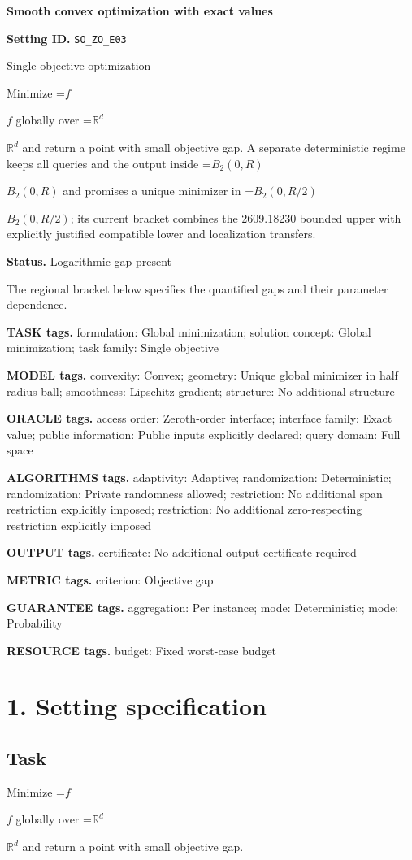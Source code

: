 \documentclass[10pt,a4paper]{article}
\newcommand{\AtlasMath}[1]{\par\begingroup\centering\setbox0=\hbox{$\displaystyle #1$}\ifdim\wd0>1.4\linewidth\typeout{ATLAS WIDE FORMULA: \the\wd0}\fi\ifdim\wd0>\linewidth\resizebox{\linewidth}{!}{\box0}\else\box0\fi\par\endgroup}
\newcommand{\AtlasInlineMath}[1]{\begingroup\setbox0=\hbox{$#1$}\ifdim\wd0>.4\linewidth\endgroup\AtlasMath{#1}\else\endgroup$#1$\fi}
\begin{document}
\raggedright

{\LARGE\bfseries\sffamily\color{AtlasNavy} Smooth convex optimization with exact values\par}\vspace{5pt}
\textbf{Setting ID.} \texttt{SO\_\allowbreak{}ZO\_\allowbreak{}E03}

Single-objective optimization

Minimize \AtlasInlineMath{f} globally over \AtlasInlineMath{\mathbb{R}^d} and return a point with small objective gap. A separate deterministic regime keeps all queries and the output inside \AtlasInlineMath{B_2(0,R)} and promises a unique minimizer in \AtlasInlineMath{B_2(0,R/2)}; its current bracket combines the 2609.18230 bounded upper with explicitly justified compatible lower and localization transfers.

\textbf{Status.} Logarithmic gap present

The regional bracket below specifies the quantified gaps and their parameter dependence.

\textbf{TASK tags.} formulation: Global minimization; solution concept: Global minimization; task family: Single objective

\textbf{MODEL tags.} convexity: Convex; geometry: Unique global minimizer in half radius ball; smoothness: Lipschitz gradient; structure: No additional structure

\textbf{ORACLE tags.} access order: Zeroth-order interface; interface family: Exact value; public information: Public inputs explicitly declared; query domain: Full space

\textbf{ALGORITHMS tags.} adaptivity: Adaptive; randomization: Deterministic; randomization: Private randomness allowed; restriction: No additional span restriction explicitly imposed; restriction: No additional zero-respecting restriction explicitly imposed

\textbf{OUTPUT tags.} certificate: No additional output certificate required

\textbf{METRIC tags.} criterion: Objective gap

\textbf{GUARANTEE tags.} aggregation: Per instance; mode: Deterministic; mode: Probability

\textbf{RESOURCE tags.} budget: Fixed worst-case budget

\section{1. Setting specification}
\subsection{Task}
Minimize \AtlasInlineMath{f} globally over \AtlasInlineMath{\mathbb{R}^d} and return a point with small objective gap.
\end{document}
